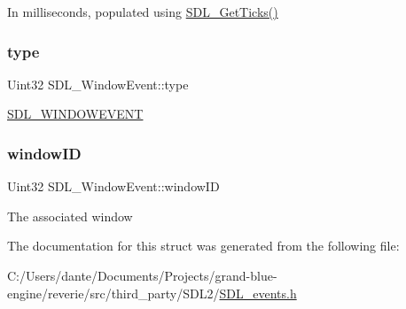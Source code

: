In milliseconds, populated using \mbox{\hyperlink{_s_d_l__timer_8h_a0b9bc71d6287e0ffafdc3419760fe2b3}{S\+D\+L\+\_\+\+Get\+Ticks()}} \mbox{\label{struct_s_d_l___window_event_a01c8c8fbe8564e690f958d2db560f657}} 
\subsubsection{\texorpdfstring{type}{type}}
{\footnotesize\ttfamily Uint32 S\+D\+L\+\_\+\+Window\+Event\+::type}

\mbox{\hyperlink{_s_d_l__events_8h_a3b589e89be6b35c02e0dd34a55f3fccaa5ff4e41f0d8b5def11cfe6a69ec0b698}{S\+D\+L\+\_\+\+W\+I\+N\+D\+O\+W\+E\+V\+E\+NT}} \mbox{\label{struct_s_d_l___window_event_a4b31796ffc84fbb7f6e9ba33e127619a}} 
\subsubsection{\texorpdfstring{windowID}{windowID}}
{\footnotesize\ttfamily Uint32 S\+D\+L\+\_\+\+Window\+Event\+::window\+ID}

The associated window 

The documentation for this struct was generated from the following file\+:\begin{DoxyCompactItemize}
\item 
C\+:/\+Users/dante/\+Documents/\+Projects/grand-\/blue-\/engine/reverie/src/third\+\_\+party/\+S\+D\+L2/\mbox{\hyperlink{_s_d_l__events_8h}{S\+D\+L\+\_\+events.\+h}}\end{DoxyCompactItemize}
